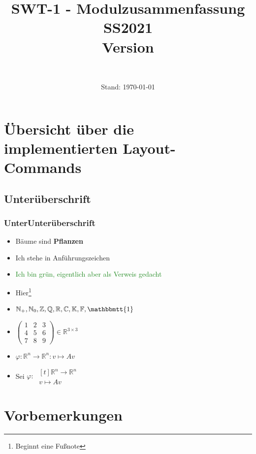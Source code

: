 \documentclass{article}
\title{SWT-1 - Modulzusammenfassung SS2021\\[\subtitlelinesep]%
    \smaller[\subtitlerelsize]{}Version \version}
\author{\ushort\\\myName}
\date{Stand: \today}
\newcommand{\N}{\mathbb{N_+}} %
\newcommand{\Nz}{{\mathbb{N}_0}} %
\newcommand{\Z}{\mathbb{Z}} %
\newcommand{\Q}{\mathbb{Q}} %
\newcommand{\R}{\mathbb{R}} %
\newcommand{\C}{\mathbb{C}} %
\newcommand{\K}{\mathbb{K}} %
\newcommand{\F}{\mathbb{F}} %
\newcommand{\matr}[1]{\begin{pmatrix}#1\end{pmatrix}} %
\newcommand{\ematr}{\mathbbmtt{1}}
\newcommand{\strongColor}[1]{\textcolor{strongColor}{#1}}
\newcommand{\strong}[1]{\textbf{\strongColor{#1}}}
\newcommand{\important}[1]{\textcolor{importantColor}{#1}}
\newcommand{\verweis}[1]{\textcolor{ForestGreen}{#1}}
\newcommand{\anfuehrung}[1]{\flqq #1\frqq}
\newcommand{\abb}[3]{#1:\;\begin{aligned}[t]#2\\#3\end{aligned}}
\begin{document}
\maketitle

\newpage

\tableofcontents
\newpage

\section{Übersicht über die implementierten Layout-Commands}
\subsection{Unterüberschrift}
\subsubsection{UnterUnterüberschrift}
\begin{itemize}
    \item \important{Bäume} sind \strong{Pflanzen}
    \item \anfuehrung{Ich stehe in Anführungszeichen}
    \item \verweis{Ich bin grün, eigentlich aber als Verweis gedacht}
    \item Hier\footnote{Beginnt eine Fußnote}
    
    \item $\N, \Nz, \Z, \Q, \R, \C, \K, \F, \ematr$
    \item $\matr{1&2&3\\4&5&6\\7&8&9}\in\R^{3\times 3}$
    
    \item $\varphi: \R^n\to\R^n: v\mapsto Av$
    
    \item Sei $\abb{\varphi}{\R^n\to\R^n}{v\mapsto Av}$ %
\end{itemize}
\newpage

\section{Vorbemerkungen}

\end{document}
